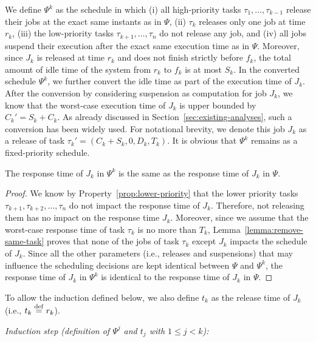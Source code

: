 We define $\Psi^k$ as the schedule in which (i) all high-priority tasks $\tau_1, \ldots, \tau_{k-1}$ release their jobs at the exact same instants as in $\Psi$, (ii) $\tau_k$ releases only one job at time $r_k$, (iii) the low-priority tasks $\tau_{k+1}, \ldots, \tau_n$ do not release any job, and (iv) all jobs suspend their execution after the exact same execution time as in $\Psi$. Moreover, since $J_k$ is released at time $r_k$ and does not finish strictly before $f_k$, the total amount of idle time of the system from $r_k$ to $f_k$ is at most $S_k$. In the converted schedule $\Psi^k$, we further convert the idle time as part of the execution time of $J_k$. After the conversion by considering suspension as computation for job $J_k$, we know that the worst-case execution time of $J_k$ is upper bounded by $C_k'=S_k+C_k$.  As already discussed in Section~\ref{sec:existing-analyses}, such a conversion has been widely used. For notational brevity, we denote this job $J_k$ as a release of task $\tau_k' = (C_k + S_k, 0, D_k, T_k)$. It is obvious that $\Psi^k$ remains as a fixed-priority schedule.

\begin{Lemma}
\label{lemma:psik}
The response time of $J_k$ in $\Psi^k$ is the same as the response time of $J_k$ in $\Psi$.
\end{Lemma}
\begin{proof}
We know by Property~\ref{prop:lower-priority} that the lower priority tasks $\tau_{k+1}, \tau_{k+2}, \ldots, \tau_n$ do not impact the response time of $J_{k}$. Therefore, not releasing them has no impact on the response time $J_k$. Moreover, since we assume that the worst-case response time of task $\tau_k$ is no more than $T_k$, Lemma~\ref{lemma:remove-same-task} proves that none of the jobs of task $\tau_k$ except $J_{k}$ impacts the schedule of $J_{k}$. Since all the other parameters (i.e., releases and suspensions) that may influence the scheduling decisions are kept identical between $\Psi$ and $\Psi^k$, the response time of $J_{k}$ in $\Psi^{k}$ is identical to the response time of $J_{k}$ in $\Psi$.
\end{proof}

To allow the induction defined below, we also define $t_k$ as the release time of $J_k$ (i.e., $t_k \stackrel{\mathrm{def}}{=} r_k$).

\noindent\textit{Induction step (definition of $\Psi^j$ and $t_j$ with $1 \leq j < k$):}

